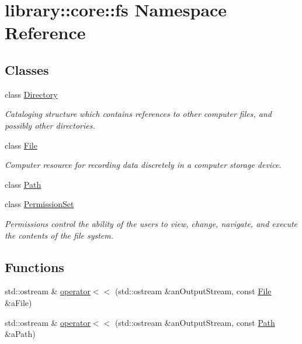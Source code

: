 \hypertarget{namespacelibrary_1_1core_1_1fs}{}\section{library\+:\+:core\+:\+:fs Namespace Reference}
\label{namespacelibrary_1_1core_1_1fs}
\subsection*{Classes}
\begin{DoxyCompactItemize}
\item 
class \hyperlink{classlibrary_1_1core_1_1fs_1_1_directory}{Directory}
\begin{DoxyCompactList}\small\item\em Cataloging structure which contains references to other computer files, and possibly other directories. \end{DoxyCompactList}\item 
class \hyperlink{classlibrary_1_1core_1_1fs_1_1_file}{File}
\begin{DoxyCompactList}\small\item\em Computer resource for recording data discretely in a computer storage device. \end{DoxyCompactList}\item 
class \hyperlink{classlibrary_1_1core_1_1fs_1_1_path}{Path}
\item 
class \hyperlink{classlibrary_1_1core_1_1fs_1_1_permission_set}{Permission\+Set}
\begin{DoxyCompactList}\small\item\em Permissions control the ability of the users to view, change, navigate, and execute the contents of the file system. \end{DoxyCompactList}\end{DoxyCompactItemize}
\subsection*{Functions}
\begin{DoxyCompactItemize}
\item 
std\+::ostream \& \hyperlink{namespacelibrary_1_1core_1_1fs_a06acb7c0054dcbe216284bdadd5663ac}{operator$<$$<$} (std\+::ostream \&an\+Output\+Stream, const \hyperlink{classlibrary_1_1core_1_1fs_1_1_file}{File} \&a\+File)
\item 
std\+::ostream \& \hyperlink{namespacelibrary_1_1core_1_1fs_a47817adc842f15a3de34925de44b2de3}{operator$<$$<$} (std\+::ostream \&an\+Output\+Stream, const \hyperlink{classlibrary_1_1core_1_1fs_1_1_path}{Path} \&a\+Path)
\end{DoxyCompactItemize}


